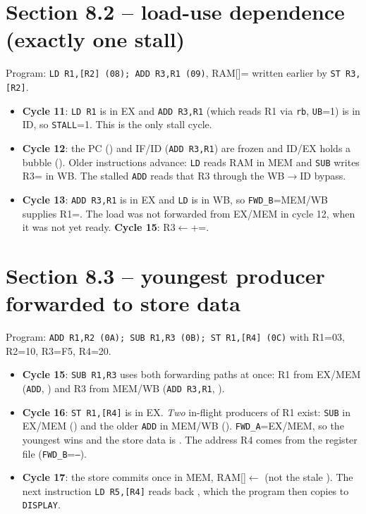\documentclass[10pt,a4paper]{article}
\begin{document}
\begin{landscape}
\section{Section 8.2 -- load-use dependence (exactly one stall)}
Program: \texttt{LD R1,[R2] (08); ADD R3,R1 (09)}, RAM[]= written earlier by \texttt{ST R3,[R2]}.
\begin{tracetab}

\end{tracetab}
\vspace{-4mm}
\begin{itemize}
\item \textbf{Cycle 11}: \texttt{LD R1} is in EX and \texttt{ADD R3,R1} (which reads R1 via \texttt{rb}, \texttt{UB}=1) is in ID, so
  \texttt{STALL}=1. This is the only stall cycle.
\item \textbf{Cycle 12}: the PC () and IF/ID (\texttt{ADD R3,R1}) are frozen and ID/EX holds a bubble
  (). Older instructions advance: \texttt{LD} reads RAM in MEM and \texttt{SUB} writes R3= in WB. The stalled
  \texttt{ADD} reads that R3 through the WB$\rightarrow$ID bypass.
\item \textbf{Cycle 13}: \texttt{ADD R3,R1} is in EX and \texttt{LD} is in WB, so \texttt{FWD\_B}=MEM/WB supplies R1=. The load
  was not forwarded from EX/MEM in cycle 12, when it was not yet ready. \textbf{Cycle 15}: R3$\leftarrow$+=.
\end{itemize}

\section{Section 8.3 -- youngest producer forwarded to store data}
Program: \texttt{ADD R1,R2 (0A); SUB R1,R3 (0B); ST R1,[R4] (0C)} with R1=03, R2=10, R3=F5, R4=20.
\begin{tracetab}

\end{tracetab}
\vspace{-4mm}
\begin{itemize}
\item \textbf{Cycle 15}: \texttt{SUB R1,R3} uses both forwarding paths at once: R1 from EX/MEM (\texttt{ADD}, ) and R3
  from MEM/WB (\texttt{ADD R3,R1}, ).
\item \textbf{Cycle 16}: \texttt{ST R1,[R4]} is in EX. \emph{Two} in-flight producers of R1 exist: \texttt{SUB} in EX/MEM
  () and the older \texttt{ADD} in MEM/WB (). \texttt{FWD\_A}=EX/MEM, so the youngest wins and the store data is
  . The address R4 comes from the register file (\texttt{FWD\_B}=\texttt{--}).
\item \textbf{Cycle 17}: the store commits once in MEM, RAM[]$\leftarrow$ (not the stale ). The next
  instruction \texttt{LD R5,[R4]} reads back , which the program then copies to \texttt{DISPLAY}.
\end{itemize}


\end{landscape}
\end{document}
